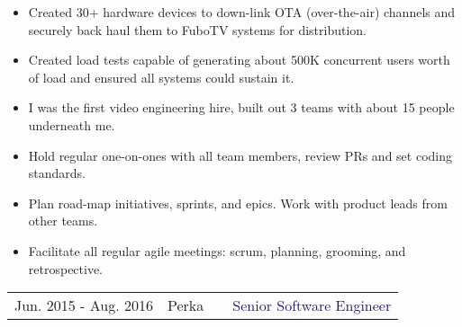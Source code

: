 \documentclass{article}
\begin{document}
\begin{multicols}{2}
\begin{small}
\begin{itemize}[leftmargin=*,label=\tiny{$\bullet$}]
    \item\begin{minipage}[t]{\linewidth}{Created 30+ hardware devices to down-link OTA (over-the-air) channels and securely back haul them to FuboTV systems for distribution.}\end{minipage}
    \item\begin{minipage}[t]{\linewidth}{Created load tests capable of generating about 500K concurrent users worth of load and ensured all systems could sustain it.}\end{minipage}
    \item\begin{minipage}[t]{\linewidth}{I was the first video engineering hire, built out 3 teams with about 15 people underneath me.}\end{minipage}
    \item\begin{minipage}[t]{\linewidth}{Hold regular one-on-ones with all team members, review PRs and set coding standards.}\end{minipage}
    \item\begin{minipage}[t]{\linewidth}{Plan road-map initiatives, sprints, and epics. Work with product leads from other teams.}\end{minipage}
    \item\begin{minipage}[t]{\linewidth}{Facilitate all regular agile meetings: scrum, planning, grooming, and retrospective.}\end{minipage}
    \end{itemize}
  \end{small} 
\end{multicols}

\vspace{15pt}\begin{tabularx}{\textwidth}{@{}llXr}
  Jun. 2015 - Aug. 2016&\textcolor{Mahogany}{Perka}&&\textcolor{MidnightBlue}{Senior Software Engineer}
\end{tabularx}
\end{document}
